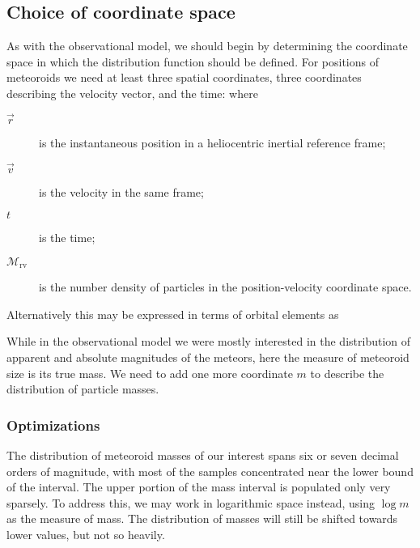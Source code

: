     \subsection{Choice of coordinate space} \label{moc}
        As with the observational model, we should begin by determining the coordinate space
        in which the distribution function should be defined. For positions of meteoroids we need at least
        three spatial coordinates, three coordinates describing the velocity vector, and the time:
        where
        \begin{description}
            \item[$\vec{r}$]
                is the instantaneous position in a heliocentric inertial reference frame;
            \item[$\vec{v}$]
                is the velocity in the same frame;
            \item[$t$]
                is the time;
            \item[$\mathcal{M}_\mathrm{rv}$]
                is the number density of particles in the position-velocity coordinate space.
        \end{description}

        Alternatively this may be expressed in terms of orbital elements as

        While in the observational model we were mostly interested in the distribution of apparent and absolute
        magnitudes of the meteors, here the measure of meteoroid size is its true mass.
        We need to add one more coordinate $m$ to describe the distribution of particle masses.

        \subsubsection{Optimizations} \label{moco}
            The distribution of meteoroid masses of our interest spans six or seven decimal orders of magnitude,
            with most of the samples concentrated near the lower bound of the interval.
            The upper portion of the mass interval is populated only very sparsely.
            To address this, we may work in logarithmic space instead, using $\log m$ as the measure of mass.
            The distribution of masses will still be shifted towards lower values, but not so heavily.

